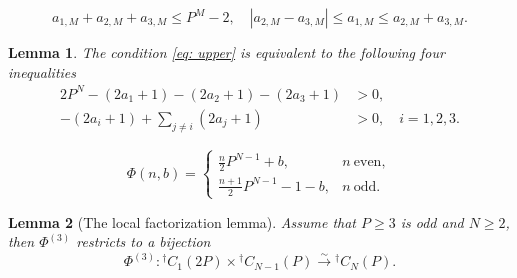 \documentclass[10pt,a4paper]{amsart}
\newtheorem{lemma}{Lemma}
\begin{document}
\begin{equation}\label{eq: lower}
a_{1,M}+a_{2,M}+a_{3,M}\leq P^M-2,\quad |a_{2,M}-a_{3,M}|\leq a_{1,M}\leq a_{2,M}+a_{3,M}.
\end{equation}

\begin{lemma}\label{eqn: four ineq}
    The condition \eqref{eq: upper} is equivalent to the following four inequalities
\begin{align*}
    2P^N -(2a_1+1)-(2a_2+1)-(2a_3+1) &>0,\\
    -(2a_i+1)+\sum_{j\neq i}(2a_j+1)&>0, \quad i=1,2,3.
\end{align*}
\end{lemma}

\begin{equation}\label{eq: Phinb}
    \Phi(n,b)=\begin{cases}
        \frac{n}{2}P^{N-1}+b, & n\ \text{even},\\
       \frac{n+1}{2} P^{N-1}-1-b, & n\ \text{odd}.
        \end{cases}
\end{equation}

\begin{lemma}[The local factorization lemma]\label{lm: local fac}
    Assume that $P\geq 3$ is odd and $N\geq 2$, then $\Phi^{(3)}$ restricts to a bijection
    \begin{equation}
        \Phi^{(3)}: {}^\dagger C_1(2P)\times {}^\dagger C_{N-1}(P)\xrightarrow{\sim} {}^\dagger C_N(P).
    \end{equation}
\end{lemma}
\end{document}
